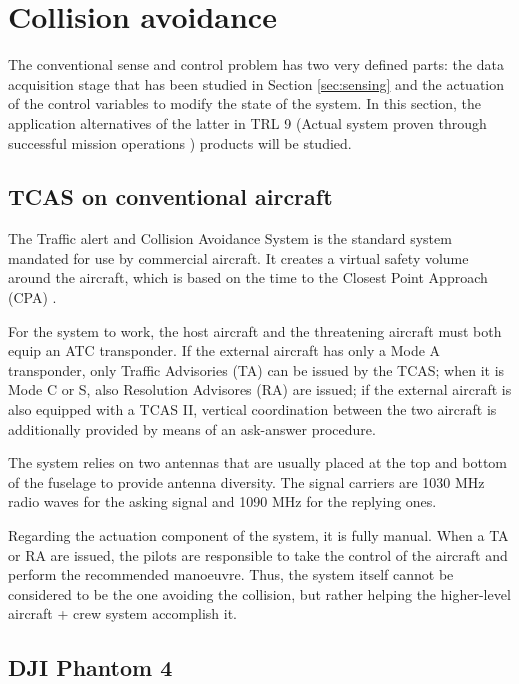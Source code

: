 

\section{Collision avoidance}

The conventional sense and control problem has two very defined parts: the data acquisition stage that has been studied in Section \ref{sec:sensing} and the actuation of the control variables to modify the state of the system.
In this section, the application alternatives of the latter in TRL 9 (Actual system proven through successful mission operations \cite{assistantsecretaryofdefenseforresearchandengineering2011}) products will be studied.

\subsection{TCAS on conventional aircraft}

The Traffic alert and Collision Avoidance System is the standard system mandated for use by commercial aircraft.
It creates a virtual safety volume around the aircraft, which is based on the time to the Closest Point Approach (CPA) \cite{tooley2009}.

For the system to work, the host aircraft and the threatening aircraft must both equip an ATC transponder.
If the external aircraft has only a Mode A transponder, only Traffic Advisories (TA) can be issued by the TCAS; when it is Mode C or S, also Resolution Advisores (RA) are issued; if the external aircraft is also equipped with a TCAS II, vertical coordination between the two aircraft is additionally provided by means of an ask-answer procedure.

The system relies on two antennas that are usually placed at the top and bottom of the fuselage to provide antenna diversity.
The signal carriers are 1030 MHz radio waves for the asking signal and 1090 MHz for the replying ones.

Regarding the actuation component of the system, it is fully manual.
When a TA or RA are issued, the pilots are responsible to take the control of the aircraft and perform the recommended manoeuvre.
Thus, the system itself cannot be considered to be the one avoiding the collision, but rather helping the higher-level aircraft + crew system accomplish it.

\subsection{DJI Phantom 4}

